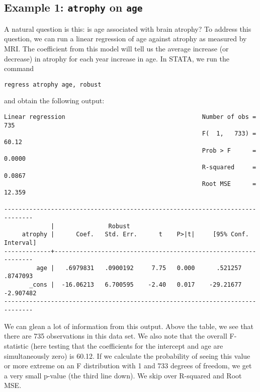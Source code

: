 \documentclass[11pt,letterpaper,fleqn]{report}
\begin{document}
\subsection{Example 1: \texttt{atrophy} on \texttt{age}}
A natural question is this: is age associated with brain atrophy? To address this question, we can run a linear regression of age against atrophy as measured by MRI. The coefficient from this model will tell us the average increase (or decrease) in atrophy for each year increase in age. In STATA, we run the command
\begin{verbatim}
regress atrophy age, robust
\end{verbatim}

and obtain the following output:
\begin{verbatim}
Linear regression                                      Number of obs =     735
                                                       F(  1,   733) =   60.12
                                                       Prob > F      =  0.0000
                                                       R-squared     =  0.0867
                                                       Root MSE      =  12.359

------------------------------------------------------------------------------
             |               Robust
     atrophy |      Coef.   Std. Err.      t    P>|t|     [95% Conf. Interval]
-------------+----------------------------------------------------------------
         age |   .6979831   .0900192     7.75   0.000      .521257    .8747093
       _cons |  -16.06213   6.700595    -2.40   0.017    -29.21677   -2.907482
------------------------------------------------------------------------------
\end{verbatim}

We can glean a lot of information from this output. Above the table, we see that there are 735 observations in this data set. We also note that the overall F-statistic (here testing that the coefficients for the intercept and age are simultaneously zero) is 60.12. If we calculate the probability of seeing this value or more extreme on an F distribution with 1 and 733 degrees of freedom, we get a very small p-value (the third line down). We skip over R-squared and Root MSE.
\end{document}

